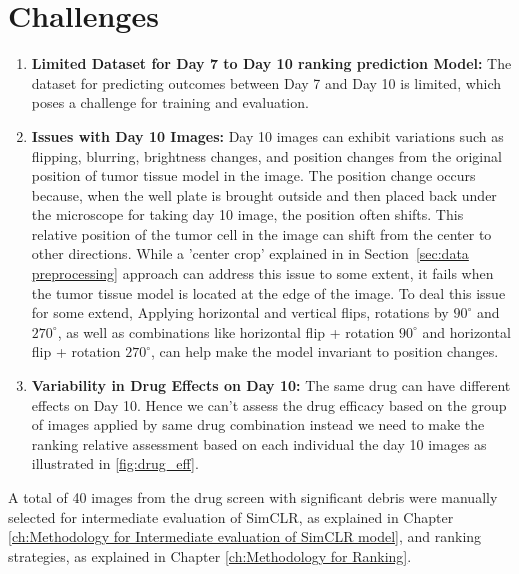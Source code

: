 \section{Challenges}
\begin{enumerate}
    \item \textbf{Limited Dataset for Day 7 to Day 10 ranking prediction Model:} The dataset for predicting outcomes between Day 7 and Day 10 is limited, which poses a challenge for training and evaluation.

    \item \textbf{Issues with Day 10 Images:}
     Day 10 images can exhibit variations such as flipping, blurring, brightness changes, and position changes from the original position of tumor tissue 
        model in the image. 
        The position change occurs because, when the well plate is brought outside and then placed back under the microscope for taking day 10 image, 
        the position often shifts. This relative position of the tumor cell in the image can shift from the center to other directions.
         While a 'center crop' explained in in Section~\ref{sec:data preprocessing} approach can address this issue to some extent, it fails when the tumor tissue model 
         is located at the edge of the image. To deal this issue for some extend, Applying horizontal and vertical flips, rotations by $90^\circ$ and $270^\circ$, as 
        well as combinations like horizontal flip + rotation $90^\circ$ and horizontal flip + rotation $270^\circ$, can help make the model invariant to position changes.
   

    \item \textbf{Variability in Drug Effects on Day 10:}
   The same drug can have different effects on Day 10. Hence we can't assess the drug efficacy based on the group of images applied by same drug combination instead we need to make the ranking relative 
        assessment based on each individual the day 10 images as illustrated in \ref{fig:drug_eff}.
 
\end{enumerate}

A total of 40 images from the drug screen with significant debris were manually selected for intermediate evaluation of SimCLR, as explained in Chapter \ref{ch:Methodology for Intermediate evaluation of SimCLR model}, and ranking strategies, as explained in Chapter \ref{ch:Methodology for Ranking}.



